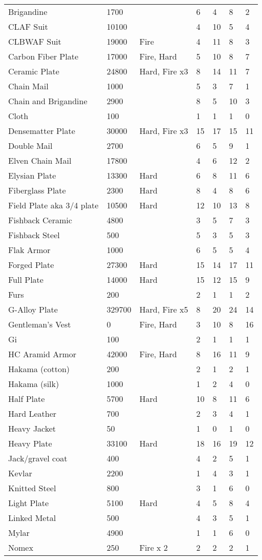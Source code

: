 \documentclass[twoside]{book}
\begin{document}
\begin{longtable}{p{1.25in}llp{2em}p{2em}p{2em}p{2em}}
      \raggedright  Brigandine& 1700&& 6& 4& 8& 2\tabularnewline
      \raggedright  CLAF Suit& 10100&& 4& 10& 5& 4\tabularnewline
      \raggedright  CLBWAF Suit& 19000& Fire& 4& 11& 8& 3\tabularnewline
      \raggedright  Carbon Fiber Plate& 17000& Fire, Hard& 5& 10& 8& 7\tabularnewline
      \raggedright  Ceramic Plate& 24800& Hard, Fire x3& 8& 14& 11& 7\tabularnewline
      \raggedright  Chain Mail& 1000&& 5& 3& 7& 1\tabularnewline
      \raggedright  Chain and Brigandine& 2900&& 8& 5& 10& 3\tabularnewline
      \raggedright  Cloth& 100&& 1& 1& 1& 0\tabularnewline
      \raggedright  Densematter Plate& 30000& Hard, Fire x3& 15& 17& 15& 11\tabularnewline
      \raggedright  Double Mail& 2700&& 6& 5& 9& 1\tabularnewline
      \raggedright  Elven Chain Mail& 17800&& 4& 6& 12& 2\tabularnewline
      \raggedright  Elysian Plate& 13300& Hard& 6& 8& 11& 6\tabularnewline
      \raggedright  Fiberglass Plate& 2300& Hard& 8& 4& 8& 6\tabularnewline
      \raggedright  Field Plate aka 3/4 plate& 10500& Hard& 12& 10& 13& 8\tabularnewline
      \raggedright  Fishback Ceramic& 4800&& 3& 5& 7& 3\tabularnewline
      \raggedright  Fishback Steel& 500&& 5& 3& 5& 3\tabularnewline
      \raggedright  Flak Armor& 1000&& 6& 5& 5& 4\tabularnewline
      \raggedright  Forged Plate& 27300& Hard& 15& 14& 17& 11\tabularnewline
      \raggedright  Full Plate& 14000& Hard& 15& 12& 15& 9\tabularnewline
      \raggedright  Furs& 200&& 2& 1& 1& 2\tabularnewline
      \raggedright  G-Alloy Plate& 329700& Hard, Fire x5& 8& 20& 24& 14\tabularnewline
      \raggedright  Gentleman's Vest& 0& Fire, Hard& 3& 10& 8& 16\tabularnewline
      \raggedright  Gi& 100&& 2& 1& 1& 1\tabularnewline
      \raggedright  HC Aramid Armor& 42000& Fire, Hard& 8& 16& 11& 9\tabularnewline
      \raggedright  Hakama (cotton)& 200&& 2& 1& 2& 1\tabularnewline
      \raggedright  Hakama (silk)& 1000&& 1& 2& 4& 0\tabularnewline
      \raggedright  Half Plate& 5700& Hard& 10& 8& 11& 6\tabularnewline
      \raggedright  Hard Leather& 700&& 2& 3& 4& 1\tabularnewline
      \raggedright  Heavy Jacket& 50&& 1& 0& 1& 0\tabularnewline
      \raggedright  Heavy Plate& 33100& Hard& 18& 16& 19& 12\tabularnewline
      \raggedright  Jack/gravel coat& 400&& 4& 2& 5& 1\tabularnewline
      \raggedright  Kevlar& 2200&& 1& 4& 3& 1\tabularnewline
      \raggedright  Knitted Steel& 800&& 3& 1& 6& 0\tabularnewline
      \raggedright  Light Plate& 5100& Hard& 4& 5& 8& 4\tabularnewline
      \raggedright  Linked Metal& 500&& 4& 3& 5& 1\tabularnewline
      \raggedright  Mylar& 4900&& 1& 1& 6& 0\tabularnewline
      \raggedright  Nomex& 250& Fire x 2& 2& 2& 2& 1\tabularnewline

\end{longtable}
\end{document}
